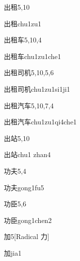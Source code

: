 \begin{entry}{出租}{5,10}
  \begin{phonetics}{出租}{chu1zu1}
  \end{phonetics}
\end{entry}

\begin{entry}{出租车}{5,10,4}
  \begin{phonetics}{出租车}{chu1zu1che1}
  \end{phonetics}
\end{entry}

\begin{entry}{出租司机}{5,10,5,6}
  \begin{phonetics}{出租司机}{chu1zu1si1ji1}
  \end{phonetics}
\end{entry}

\begin{entry}{出租汽车}{5,10,7,4}
  \begin{phonetics}{出租汽车}{chu1zu1qi4che1}
  \end{phonetics}
\end{entry}

\begin{entry}{出站}{5,10}
  \begin{phonetics}{出站}{chu1 zhan4}
  \end{phonetics}
\end{entry}

\begin{entry}{功夫}{5,4}
  \begin{phonetics}{功夫}{gong1fu5}
  \end{phonetics}
\end{entry}

\begin{entry}{功臣}{5,6}
  \begin{phonetics}{功臣}{gong1chen2}
  \end{phonetics}
\end{entry}

\begin{entry}{加}{5}[Radical 力]
  \begin{phonetics}{加}{jia1}
  \end{phonetics}
\end{entry}

